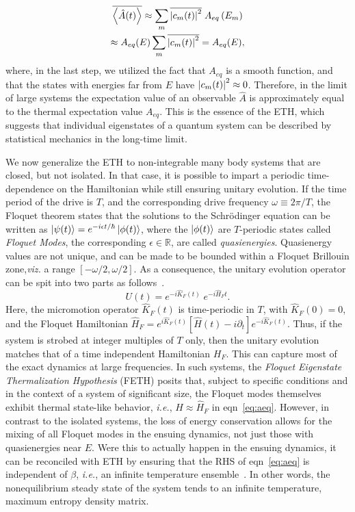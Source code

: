\documentclass[%
reprint,
superscriptaddress,
amsmath,amssymb,
aps,
prb,
showkeys,
]{revtex4-2}
\begin{document}
	\begin{multline*}
		\overline{\expval{\hat{A}(t)}} \approx \sum_m \overline{\abs{c_m(t)}^2}\; {A}_{eq}\left(E_m\right)\\
		\approx {A}_{eq}(E)\sum_m \overline{\abs{c_m(t)}^2} = A_{eq}(E),
	\end{multline*}
	where, in the last step, we utilized the fact that $A_{eq}$ is a smooth function, and that the states with energies far from $E$ have $\abs{c_m(t)}^2\approx 0$. Therefore, in the limit of large systems the expectation value of an observable $\hat{A}$ is approximately equal to the thermal expectation value $A_{eq}$. This is the essence of the ETH, which suggests that individual eigenstates of a quantum system can be described by statistical mechanics in the long-time limit.
	
	We now generalize the ETH to non-integrable many body systems that are closed, but not isolated. In that case, it is possible to impart a periodic time-dependence on the Hamiltonian while still ensuring unitary evolution. If the time period of the drive is $T$, and the corresponding drive frequency $\omega\equiv 2\pi/T$, the Floquet theorem states that the solutions to the Schrödinger equation can be written as $\ket{\psi(t)} = e^{-i\epsilon t/\hbar} \ket{\phi(t)}$, where the $\ket{\phi(t)}$ are $T$-periodic states called \textit{Floquet Modes}, the corresponding $\epsilon\in \mathbb{R}$, are called \textit{quasienergies}. Quasienergy values are not unique, and can be made to be bounded within a Floquet {Brillouin zone},\textit{viz.} a range $[-\omega/2, \omega/2]$\cite{holthaus_floquet_2016,vogl_effective_2020}. As a consequence, the unitary evolution operator can be spit into two parts as follows~\cite{Bukov2014}.
	\begin{equation}
		\label{eq:propagator}
		U(t) = e^{-i\hat{K}_F(t)}\;e^{-i\hat{H}_Ft}.
	\end{equation}
	Here, the micromotion operator $\hat{K}_F(t)$ is time-periodic in $T$, with $\hat{K}_F(0)=0$, and the Floquet Hamiltonian  {$\hat{H}_F = e^{i\hat{K}_F(t)} \left[\hat{H}(t)-i\partial_t\right] e^{-i \hat{K}_F(t)}$}. Thus, if the system is strobed at integer multiples of $T$ only, then the unitary evolution matches that of a time independent Hamiltonian $H_F$. This can capture most of the exact dynamics at large frequencies. In such systems, the \textit{Floquet Eigenstate Thermalization Hypothesis} (FETH)\cite{Mori_2018, Mori_2023_1} posits that, subject to specific conditions and in the context of a system of significant size, the Floquet modes themselves exhibit thermal state-like behavior, \textit{i.e.}, $\hat{H}\approx \hat{H}_F$ in eqn~\ref{eq:aeq}. However, in contrast to the isolated systems, the loss of energy conservation allows for the mixing of all Floquet modes in the ensuing dynamics, not just those with quasienergies near $E$. Were this to actually happen in the ensuing dynamics,  {it can be reconciled with ETH by ensuring that the RHS of eqn}~\ref{eq:aeq} {is independent of} $\beta$, \textit{i.e.}{, an infinite temperature ensemble}~\cite{alessio}. In other words, the nonequilibrium steady state of the system tends to an infinite temperature, maximum entropy density matrix.
	
\end{document}

